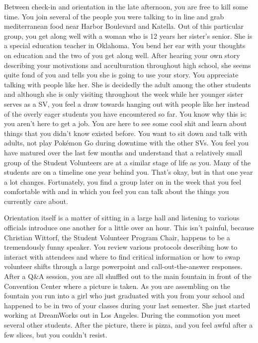 \documentclass[../main.tex]{subfiles}
\begin{document}
Between check-in and orientation in the late afternoon, you are free to kill some time. You join several of the people you were talking to in line and grab mediterranean food near Harbor Boulevard and Katella. Out of this particular group, you get along well with a woman who is 12 years her sister's senior. She is a special education teacher in Oklahoma. You bend her ear with your thoughts on education and the two of you get along well. After hearing your own story describing your motivations and acculturation throughout high school, she seems quite fond of you and tells you she is going to use your story. You appreciate talking with people like her. She is decidedly the adult among the other students and although she is only visiting throughout the week while her younger sister serves as a SV, you feel a draw towards hanging out with people like her instead of the overly eager students you have encountered so far. You know why this is: you aren't here to get a job. You are here to see some cool shit and learn about things that you didn't know existed before. You want to sit down and talk with adults, not play Pokémon Go during downtime with the other SVs. You feel you have matured over the last few months and understand that a relatively small group of the Student Volunteers are at a similar stage of life as you. Many of the students are on a timeline one year behind you. That's okay, but in that one year a lot changes. Fortunately, you find a group later on in the week that you feel comfortable with and in which you feel you can talk about the things you currently care about.

Orientation itself is a matter of sitting in a large hall and listening to various officials introduce one another for a little over an hour. This isn't painful, because Christian Wittorf, the Student Volunteer Program Chair, happens to be a tremendously funny speaker. You review various protocols describing how to interact with attendees and where to find critical information or how to swap volunteer shifts through a large powerpoint and call-out-the-answer responses. After a Q\&A session, you are all shuffled out to the main fountain in front of the Convention Center where a picture is taken. As you are assembling on the fountain you run into a girl who just graduated with you from your school and happened to be in two of your classes during your last semester. She just started working at DreamWorks out in Los Angeles. During the commotion you meet several other students. After the picture, there is pizza, and you feel awful after a few slices, but you couldn't resist.
\end{document}
